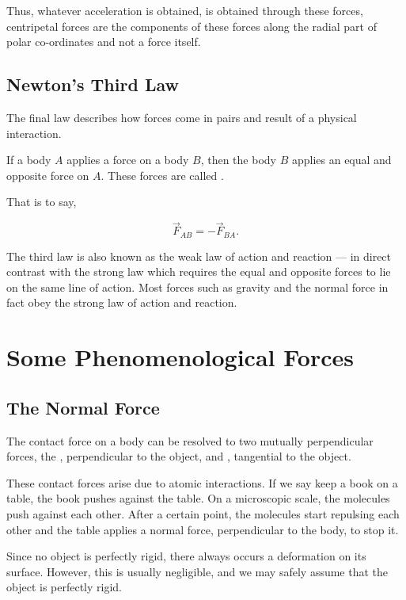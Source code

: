 Thus, whatever acceleration is obtained, is obtained through these forces, centripetal forces
are the components of these forces along the radial part of polar co-ordinates and not 
a force itself.

\subsection{Newton's Third Law}

The final law describes how forces come in pairs and result of a physical interaction.

\begin{axioms}
     If a body \(A\) applies a force on a body \(B\), then the body 
    \(B\) applies an equal and opposite force on \(A\). These forces are 
    called .
\end{axioms}

That is to say, 

\[\Vec{F}_{AB} = - \Vec{F}_{BA}.\]

The third law is also known as the weak law of action and reaction ---
in direct contrast with the strong law which requires the equal and opposite
forces to lie on the same line of action. Most forces such as gravity and the
normal force in fact obey the strong law of action and reaction.


\section{Some Phenomenological Forces}

\subsection{The Normal Force}

The contact force on a body can be resolved to two mutually perpendicular forces, the ,
perpendicular to the object, and , tangential to the object. 

These contact forces arise due to atomic interactions. If we say keep a book on a table,
the book pushes against the table. On a microscopic scale, the molecules push against each other.
After a certain point, the molecules start repulsing each other and the table applies a normal force,
perpendicular to the body, to stop it. 

Since no object is perfectly rigid, there always occurs a deformation on its surface. However, 
this is usually negligible, and we may safely assume that the object is perfectly rigid. 

